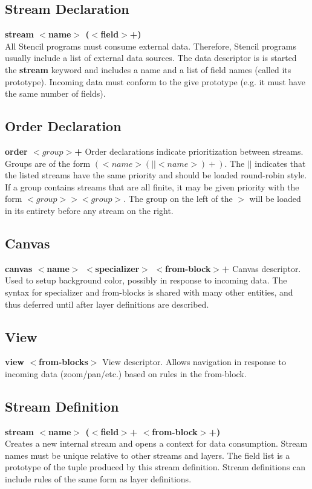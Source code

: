 \documentclass{article}
\begin{document}
\subsection{Stream Declaration}
\textbf{stream $<$name$>$ ($<$field$>$+)}\\
All Stencil programs must consume external data.
Therefore, Stencil programs usually include a list of external data sources.  
The data descriptor is is started the \textbf{stream} keyword and includes a name and a list of field names (called  its prototype).  
Incoming data must conform to the give prototype (e.g. it must have the same number of fields).

\subsection{Order Declaration}
\textbf{order $<group>$+}
Order declarations indicate prioritization between streams.
Groups are of the form $(<name> (|| <name>)+)$.  The $||$ indicates that
the listed streams have the same priority and should be loaded round-robin style.
If a  group contains streams that are all finite, it may be given priority with the form  $<group> > <group>$.
The group on the left of the $>$ will be loaded in its entirety before any stream on the right.


\subsection{Canvas}
\textbf{canvas $<$name$>$ $<$specializer$>$ $<$from-block$>$+}
Canvas descriptor. Used to setup background color, possibly in response to incoming data.
The syntax for specializer and from-blocks is shared with many other entities, and thus deferred until after layer definitions are described.


\subsection{View}
\textbf{view $<$from-blocks$>$}
View descriptor. Allows navigation in response to incoming data (zoom/pan/etc.) based on rules in the from-block.


\subsection{Stream Definition}
\textbf{stream $<$name$>$ ($<$field$>$+ $<$from-block$>$+)}\\
Creates a new internal stream and opens a context for data consumption.
Stream names must be unique relative to other streams and layers.
The field list is a prototype of the tuple produced by this stream definition.
Stream definitions can include rules of the same form as layer definitions.
\end{document}
